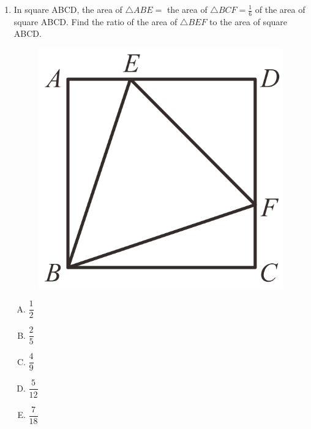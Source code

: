 \documentclass[12pt]{scrartcl}
\begin{document}
\begin{enumerate}
    \newpage
    \item In square ABCD, the area of $\triangle ABE = $ the area of $\triangle BCF = \frac{1}{6}$ of the area of square ABCD. Find the ratio of the area of $\triangle BEF$ to the area of square ABCD.
    \begin{figure}[h]
        \centering
        \includegraphics[scale=0.4]{StarGen/0Figure/wmi2023G6A-num15.png}
    \end{figure}
    \begin{multicols}{5}
        \begin{enumerate}[(A)]
            \item $\dfrac{1}{2}$
            \item $\dfrac{2}{5}$
            \item $\dfrac{4}{9}$
            \item $\dfrac{5}{12}$
            \item $\dfrac{7}{18}$
        \end{enumerate}
    \end{multicols} \hrulefill


\end{enumerate}
\end{document}
